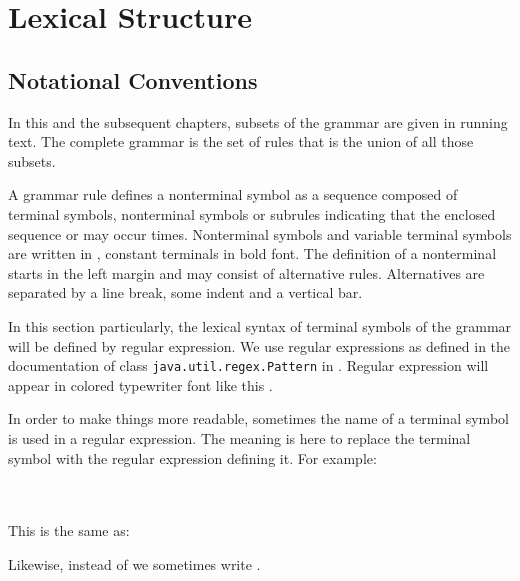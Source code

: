 
\chapter{Lexical Structure} \label{lexical structure}

\section{Notational Conventions}

In this and the subsequent chapters, subsets of the \frege{} grammar are given in running text. The complete grammar is the set of rules that is the union of all those subsets.

\par A
grammar rule defines a nonterminal symbol as a sequence composed of terminal symbols, nonterminal symbols or subrules indicating that the enclosed sequence  or may occur  times.
Nonterminal symbols and variable terminal symbols are written in , constant terminals in bold  font.
The definition of a nonterminal starts in the left margin and may
consist of alternative rules. Alternatives are separated by a
line break, some indent and a vertical bar.

\par In this section particularly, the lexical syntax of terminal symbols of the grammar will be defined by regular expression.
We use regular expressions as defined in the documentation of class
\texttt{java.util.regex.Pattern} in \cite{apidoc}. Regular expression
will appear in colored typewriter font like this
.

In order to make things more readable, sometimes the name of a terminal symbol is used in a regular expression. The meaning is here to replace the terminal symbol with the regular expression defining it. For example:

\begin{flushleft}
  \\
   \\
This is the same as:\\
 
\end{flushleft}

Likewise, instead of  we sometimes write \oder{}.

